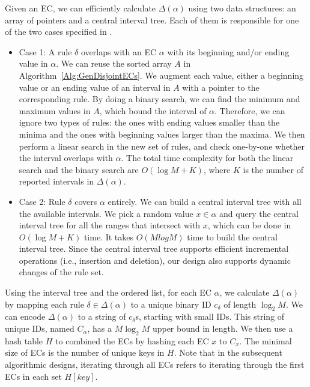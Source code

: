 Given an EC, we can efficiently calculate $\Delta(\alpha)$ using two data structures: an array of pointers and a central interval tree.
Each of them is responsible for one of the two cases specified in \cite{FindIntersectionWiki}.
\begin{itemize}
\item Case 1: A rule $\delta$ overlaps with an EC $\alpha$ with its beginning and/or ending value in $\alpha$.
        We can reuse the sorted array $A$ in Algorithm~\ref{Alg:GenDisjointECs}.
        We augment each value, either a beginning value or an ending value of an interval in $A$ with a pointer to the corresponding rule.
        By doing a binary search, we can find the minimum and maximum values in $A$,
        which bound the interval of $\alpha$.
       Therefore, we can ignore two types of rules: the ones with ending values smaller than the minima and the ones with beginning values larger than the maxima.
        We then perform a linear search in the new set of rules, and check one-by-one whether the interval overlaps with $\alpha$.
        The total time complexity for both the linear search and the binary search are $O(\log M + K)$,
        where $K$ is the number of reported intervals in $\Delta(\alpha)$.

\item Case 2: Rule $\delta$ covers $\alpha$ entirely. We can build
        a central interval tree\cite{ComputationalGeometryBook} with all the available intervals.
        We pick a random value $x \in \alpha$ and query the central interval tree for
        all the ranges that intersect with $x$, which can be done in $O(\log M + K)$ time. It takes $O(M log M)$ time to build the central interval tree.
        Since the central interval tree supports efficient incremental operations (i.e., insertion and deletion), our design also supports dynamic changes of the rule set.
\end{itemize}

Using the interval tree and the ordered list, for each EC $\alpha$,
we calculate $\Delta(\alpha)$ by mapping each rule $\delta \in \Delta(\alpha)$ to a unique binary ID $c_\delta$ of length $\log_2 M$.
We can encode $\Delta(\alpha)$ to a string of $c_\delta$s, starting with small IDs.
This string of unique IDs, named $C_\alpha$, has a $M\log_2 M$ upper bound in length.
We then use a hash table $H$ to combined the ECs by hashing each EC $x$ to $C_x$.
The minimal size of ECs is the number of unique keys in $H$.
Note that in the subsequent algorithmic designs, iterating through all ECs refers to iterating through the first ECs in each set $H[key]$.%

